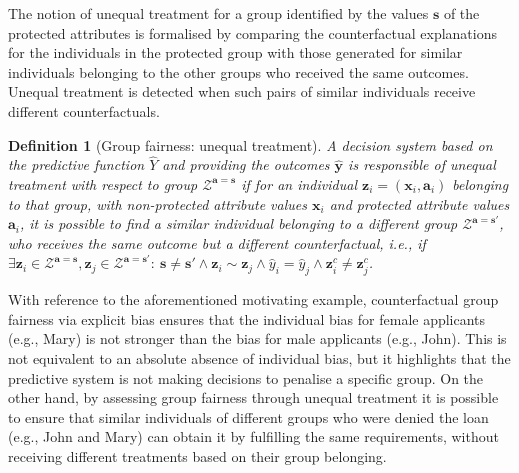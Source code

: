 \documentclass[letterpaper]{article} %
\newtheorem{definition}{Definition}
\begin{document}
The notion of unequal treatment for a group identified by the values $\boldsymbol{s}$ of the protected attributes is formalised by comparing the counterfactual explanations for the individuals in the protected group with those generated for similar individuals belonging to the other groups who received the same outcomes.
%
Unequal treatment is detected when such pairs of similar individuals receive different counterfactuals.
%
\begin{definition}[Group fairness: unequal treatment]\label{unequal_treatment_group}
	A decision system based on the predictive function $\hat{Y}$ and providing the outcomes $\boldsymbol{\hat{y}}$ is responsible of \emph{unequal treatment} with respect to group $\mathcal{Z}^{\boldsymbol{a}=\boldsymbol{s}}$ if for an individual $\boldsymbol{z}_i = (\boldsymbol{x}_i, \boldsymbol{a}_i)$ belonging to that group, with non-protected attribute values $\boldsymbol{x}_i$ and protected attribute values $\boldsymbol{a}_i$, it is possible to find a similar individual belonging to a different group $\mathcal{Z}^{\boldsymbol{a}=\boldsymbol{s}'}$, who receives the same outcome but a different counterfactual, i.e., if $\exists \boldsymbol{z}_i \in \mathcal{Z}^{\boldsymbol{a}=\boldsymbol{s}}, \boldsymbol{z}_j \in \mathcal{Z}^{\boldsymbol{a}=\boldsymbol{s}'} : ~ \boldsymbol{s} \neq \boldsymbol{s}' \wedge \boldsymbol{z}_i \sim \boldsymbol{z}_j \wedge \hat{y}_i = \hat{y}_j \wedge \boldsymbol{z}_i^c \neq \boldsymbol{z}_j^c$.
\end{definition}

With reference to the aforementioned motivating example, counterfactual group fairness via explicit bias ensures that the individual bias for female applicants (e.g., Mary) is not stronger than the bias for male applicants (e.g., John). This is not equivalent to an absolute absence of individual bias, but it highlights that the predictive system is not making decisions to penalise a specific group.
%
On the other hand, by assessing group fairness through unequal treatment it is possible to ensure that similar individuals of different groups who were denied the loan (e.g., John and Mary) can obtain it by fulfilling the same requirements, without receiving different treatments based on their group belonging.
\end{document}
